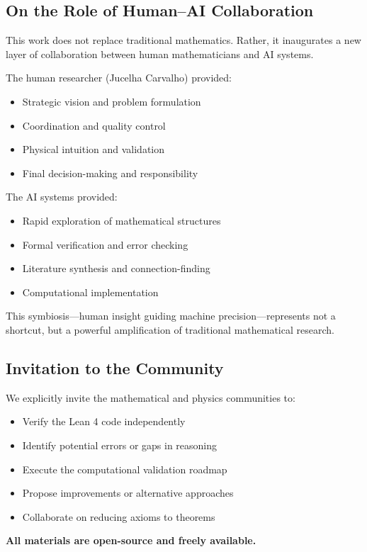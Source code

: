 \documentclass[11pt]{article}
\theoremstyle{definition}
\theoremstyle{remark}
\begin{document}
\subsection{On the Role of Human--AI Collaboration}

This work does not replace traditional mathematics. Rather, it inaugurates a new layer of collaboration between human mathematicians and AI systems.

The human researcher (Jucelha Carvalho) provided:
\begin{itemize}
\item Strategic vision and problem formulation
\item Coordination and quality control
\item Physical intuition and validation
\item Final decision-making and responsibility
\end{itemize}

The AI systems provided:
\begin{itemize}
\item Rapid exploration of mathematical structures
\item Formal verification and error checking
\item Literature synthesis and connection-finding
\item Computational implementation
\end{itemize}

This symbiosis---human insight guiding machine precision---represents not a shortcut, but a powerful amplification of traditional mathematical research.

\subsection{Invitation to the Community}

We explicitly invite the mathematical and physics communities to:
\begin{itemize}
\item Verify the Lean 4 code independently
\item Identify potential errors or gaps in reasoning
\item Execute the computational validation roadmap
\item Propose improvements or alternative approaches
\item Collaborate on reducing axioms to theorems
\end{itemize}

\textbf{All materials are open-source and freely available.}
\end{document}

